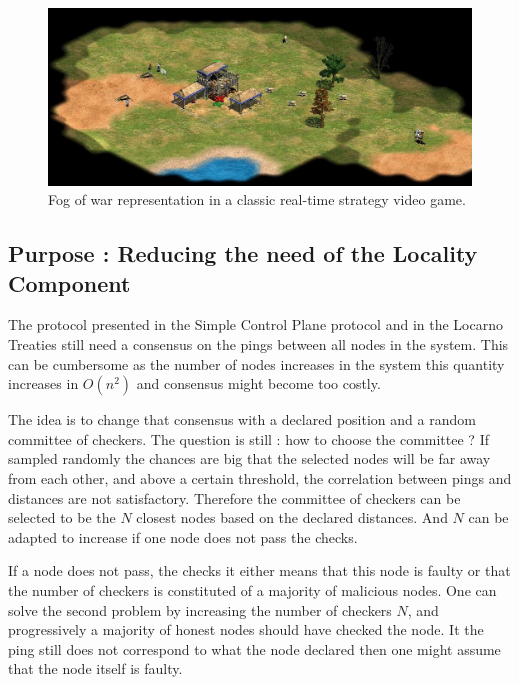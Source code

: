 \documentclass[a4paper,11pt,oneside]{report}
\begin{document}
\begin{figure}[!h] 
\centering
\includegraphics[width=400pt]{figures/fog_of_war}
\caption{Fog of war representation in a classic real-time strategy video game. }
\label{fig:registrationprotocol}
\end{figure}

\subsection{Purpose : Reducing the need of the Locality Component}
The protocol presented in the Simple Control Plane protocol and in the Locarno
Treaties still need a consensus on the pings between all nodes in the system.
This can be cumbersome as the number of nodes increases in the system this
quantity increases in $O(n^2)$ and consensus might become too costly. 

The idea is to change that consensus with a declared position and a random
committee of checkers. The question is still : how to choose the committee ? If
sampled randomly the chances are big that the selected nodes will be far away
from each other, and above a certain threshold, the correlation between pings
and distances are not satisfactory. Therefore the committee of checkers can be
selected to be the $N$ closest nodes based on the declared distances. And $N$
can be adapted to increase if one node does not pass the checks. 

If a node does not pass, the checks it either means that this node is faulty or
that the number of checkers is constituted of a majority of malicious nodes.
One can solve the second problem by increasing the number of checkers $N$, and
progressively a majority of honest nodes should have checked the node. It the
ping still does not correspond to what the node declared then one might assume
that the node itself is faulty. 
\end{document}
